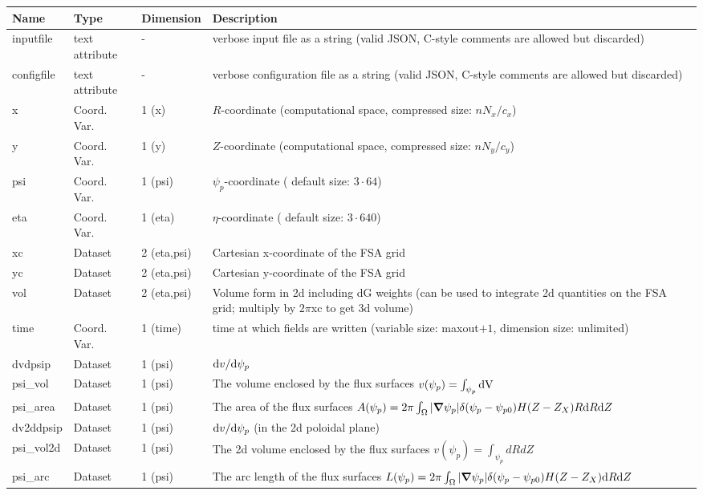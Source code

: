 \begin{longtable}{lll>{\RaggedRight}p{7cm}}
\toprule
\rowcolor{gray!50}\textbf{Name} &  \textbf{Type} & \textbf{Dimension} & \textbf{Description}  \\ \midrule
inputfile  &     text attribute & - & verbose input file as a string (valid JSON, C-style comments are allowed but discarded) \\
configfile   &     text attribute & - & verbose configuration file as a string (valid JSON, C-style comments are allowed but discarded) \\
x                & Coord. Var. & 1 (x) & $R$-coordinate (computational space, compressed size: $nN_x/c_x$)\\
y                & Coord. Var. & 1 (y) & $Z$-coordinate (computational space, compressed size: $nN_y/c_y$)\\
psi              & Coord. Var. & 1 (psi) & $\psi_p$-coordinate ( default size: $3\cdot 64$) \\
eta              & Coord. Var. & 1 (eta) & $\eta$-coordinate ( default size: $3\cdot 640$) \\
xc               & Dataset & 2 (eta,psi) & Cartesian x-coordinate of the FSA grid \\
yc               & Dataset & 2 (eta,psi) & Cartesian y-coordinate of the FSA grid\\
vol              & Dataset & 2 (eta,psi) & Volume form in 2d including dG weights (can be used to integrate 2d quantities on the FSA grid; multiply by $2\pi$xc to get 3d volume)  \\
time             & Coord. Var. & 1 (time)& time at which fields are written (variable size: maxout$+1$, dimension size: unlimited) \\
dvdpsip          & Dataset & 1 (psi) & $\mathrm{d} v/\mathrm{d}\psi_p$ \\
psi\_vol         & Dataset & 1 (psi) & The volume enclosed by the flux surfaces $v(\psi_p) = \int_{\psi_p} \mathrm{dV}\, $ \\
psi\_area        & Dataset & 1 (psi) & The area of the flux surfaces $A(\psi_p) = 2\pi \int_\Omega |{\boldsymbol{\nabla}}\psi_p| \delta(\psi_p - \psi_{p0}) H(Z-Z_X) R\mathrm{d} R\mathrm{d} Z$ \\
dv2ddpsip        & Dataset & 1 (psi) & $\mathrm{d} v/\mathrm{d}\psi_p$ (in the 2d poloidal plane) \\
psi\_vol2d       & Dataset & 1 (psi) & The 2d volume enclosed by the flux surfaces $v(\psi_p) = \int_{\psi_p} dRdZ $ \\
psi\_arc         & Dataset & 1 (psi) & The arc length of the flux surfaces $L(\psi_p) = 2\pi \int_\Omega |{\boldsymbol{\nabla}}\psi_p| \delta(\psi_p - \psi_{p0}) H(Z-Z_X) \mathrm{d} R\mathrm{d} Z$ \\

\end{longtable}
